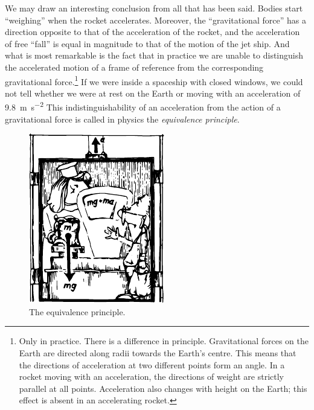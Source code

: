 We may draw an interesting conclusion from all that
has been said. Bodies start ``weighing'' when the rocket
accelerates. Moreover, the ``gravitational force'' has a
direction opposite to that of the acceleration of the rocket,
and the acceleration of free ``fall'' is equal in magnitude
to that of the motion of the jet ship. And what is most
remarkable is the fact that in practice we are unable to
distinguish the accelerated motion of a frame of reference
from the corresponding gravitational force.\footnote{Only in practice. There is a difference in principle. Gravitational forces on the Earth are directed along radii towards the Earth's centre. This means that the directions of acceleration at two different points form an angle. In a rocket moving with an acceleration, the directions of weight are strictly parallel at all points. Acceleration also changes with height on the Earth; this effect is absent in an accelerating rocket.} If we were inside a spaceship with closed windows, we could not tell
whether we were at rest on the Earth or moving with
an acceleration of \SI{9.8}{\meter\per\second\squared} This indistinguishability of an acceleration from the action of a gravitational force is called in physics the \emph{equivalence principle}\label{eqpr}.

\begin{figure}[!ht]
\centering
\includegraphics[width=\textwidth]{figures/fig-02-07.pdf}
\caption{The equivalence principle.}
\label{fig-2.07}
\end{figure}

